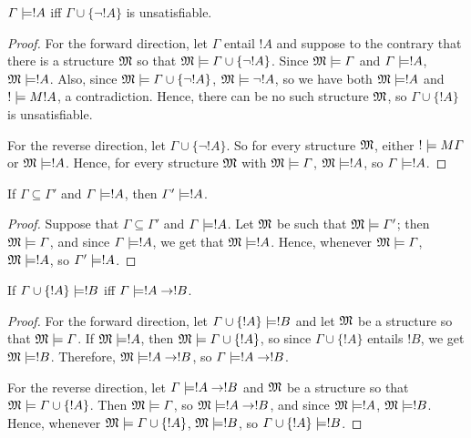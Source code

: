\documentclass[open-logic-section]{subfiles}
\begin{document}
\begin{prop}
$\Gamma \Entails !A$ iff $\Gamma \cup \{\lnot !A\}$ is unsatisfiable.
\end{prop}

\begin{proof}
For the forward direction, let $\Gamma$ entail $!A$ and suppose to the
contrary that there is a structure $\mathfrak M$ so that $\Sat{M}{\Gamma
  \cup \{ \lnot !A \}}$. Since $\Sat{M}{\Gamma}$ and $\Gamma \Entails
!A$, $\Sat{M}{!A}$. Also, since $\Sat{M}{\Gamma\cup \{ \lnot !A \}}$,
$\Sat{M}{\lnot !A}$, so we have both $\Sat{M}{!A}$ and $\Sat!{M}{!A}$,
a contradiction. Hence, there can be no such structure $\mathfrak M$, so
$\Gamma \cup \{ !A \}$ is unsatisfiable.

For the reverse direction, let $\Gamma \cup \{ \lnot !A \}$. So for
every structure $\mathfrak M$, either $\Sat!{M}{\Gamma}$ or
$\Sat{M}{!A}$. Hence, for every structure $\mathfrak M$ with
$\Sat{M}{\Gamma}$, $\Sat{M}{!A}$, so $\Gamma \Entails !A$.
\end{proof}

\begin{prop}
If $\Gamma \subseteq \Gamma'$ and $\Gamma \Entails !A$, then $\Gamma'
\Entails !A$.
\end{prop}

\begin{proof}
Suppose that $\Gamma \subseteq \Gamma'$ and $\Gamma \Entails !A$. Let $\mathfrak M$ be such that $\Sat{M}{\Gamma'}$; then $\Sat{M}{\Gamma}$, and since $\Gamma \Entails !A$, we get that $\Sat{M}{!A}$. Hence, whenever $\Sat{M}{\Gamma}$, $\Sat{M}{!A}$, so $\Gamma' \Entails !A$.
\end{proof}


\begin{thm}
If $\Gamma \cup \{!A\} \Entails !B$ iff $\Gamma \Entails !A \lif !B$.
\end{thm}

\begin{proof}
For the forward direction, let $\Gamma \cup \{ !A \} \Entails !B$ and let $\mathfrak M$ be a structure so that $\Sat{M}{\Gamma}$. If $\Sat{M}{!A}$, then $\Sat{M}{\Gamma \cup \{ !A \} }$, so since $\Gamma \cup \{ !A \}$ entails $!B$, we get $\Sat{M}{!B}$. Therefore, $\Sat{M}{!A \lif !B}$, so $\Gamma \Entails !A \lif !B$.

For the reverse direction, let $\Gamma \Entails !A \lif !B$ and $\mathfrak M$ be a structure so that $\Sat{M}{\Gamma \cup \{ !A \}}$. Then $\Sat{M}{\Gamma}$, so $\Sat{M}{!A \lif !B}$, and since $\Sat{M}{!A}$, $\Sat{M}{!B}$. Hence, whenever $\Sat{M}{\Gamma \cup \{ !A \} }$, $\Sat{M}{!B}$, so $\Gamma \cup \{ !A \} \Entails !B$.
\end{proof}
\end{document}
